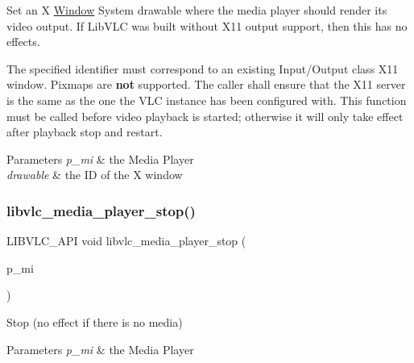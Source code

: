 Set an X \hyperlink{classWindow}{Window} System drawable where the media player should render its video output. If Lib\+V\+LC was built without X11 output support, then this has no effects.

The specified identifier must correspond to an existing Input/\+Output class X11 window. Pixmaps are {\bfseries not} supported. The caller shall ensure that the X11 server is the same as the one the V\+LC instance has been configured with. This function must be called before video playback is started; otherwise it will only take effect after playback stop and restart.


\begin{DoxyParams}{Parameters}
{\em p\+\_\+mi} & the Media Player \\
\hline
{\em drawable} & the ID of the X window \\
\hline
\end{DoxyParams}
\mbox{\label{group__libvlc__media__player_gacefc05e7806905447a436d3fc242e6de}} 
\subsubsection{\texorpdfstring{libvlc\+\_\+media\+\_\+player\+\_\+stop()}{libvlc\_media\_player\_stop()}}
{\footnotesize\ttfamily L\+I\+B\+V\+L\+C\+\_\+\+A\+PI void libvlc\+\_\+media\+\_\+player\+\_\+stop (\begin{DoxyParamCaption}\item[{libvlc\+\_\+media\+\_\+player\+\_\+t $\ast$}]{p\+\_\+mi }\end{DoxyParamCaption})}

Stop (no effect if there is no media)


\begin{DoxyParams}{Parameters}
{\em p\+\_\+mi} & the Media Player \\
\hline
\end{DoxyParams}
\mbox{\label{group__libvlc__media__player_ga3c38df27467a03f96f9ed0f6b585baaa}} 
